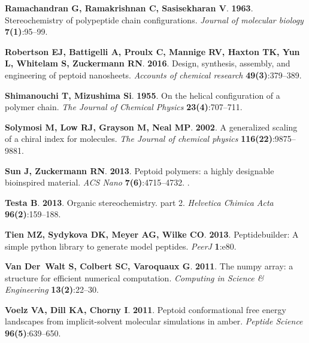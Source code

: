 \documentclass[fleqn,10pt,lineno]{wlpeerj} %
\begin{document}
\begin{thebibliography}{58}
\textbf{Ramachandran G, Ramakrishnan C, Sasisekharan V}. \textbf{1963}.
\newblock Stereochemistry of polypeptide chain configurations.
\newblock \emph{Journal of molecular biology} \textbf{7(1)}:95--99.

\textbf{Robertson EJ, Battigelli A, Proulx C, Mannige RV, Haxton TK, Yun L,
  Whitelam S, Zuckermann RN}. \textbf{2016}.
\newblock Design, synthesis, assembly, and engineering of peptoid nanosheets.
\newblock \emph{Accounts of chemical research} \textbf{49(3)}:379--389.

\textbf{Shimanouchi T, Mizushima Si}. \textbf{1955}.
\newblock On the helical configuration of a polymer chain.
\newblock \emph{The Journal of Chemical Physics} \textbf{23(4)}:707--711.

\textbf{Solymosi M, Low RJ, Grayson M, Neal MP}. \textbf{2002}.
\newblock A generalized scaling of a chiral index for molecules.
\newblock \emph{The Journal of chemical physics} \textbf{116(22)}:9875--9881.

\textbf{Sun J, Zuckermann RN}. \textbf{2013}.
\newblock Peptoid polymers: a highly designable bioinspired material.
\newblock \emph{ACS Nano} \textbf{7(6)}:4715--4732.
\newblock {}.

\textbf{Testa B}. \textbf{2013}.
\newblock Organic stereochemistry. part 2.
\newblock \emph{Helvetica Chimica Acta} \textbf{96(2)}:159--188.

\textbf{Tien MZ, Sydykova DK, Meyer AG, Wilke CO}. \textbf{2013}.
\newblock Peptidebuilder: A simple python library to generate model peptides.
\newblock \emph{PeerJ} \textbf{1}:e80.

\textbf{Van Der~Walt S, Colbert SC, Varoquaux G}. \textbf{2011}.
\newblock The numpy array: a structure for efficient numerical computation.
\newblock \emph{Computing in Science \& Engineering} \textbf{13(2)}:22--30.

\textbf{Voelz VA, Dill KA, Chorny I}. \textbf{2011}.
\newblock Peptoid conformational free energy landscapes from implicit-solvent
  molecular simulations in amber.
\newblock \emph{Peptide Science} \textbf{96(5)}:639--650.


\end{thebibliography}
\end{document}
